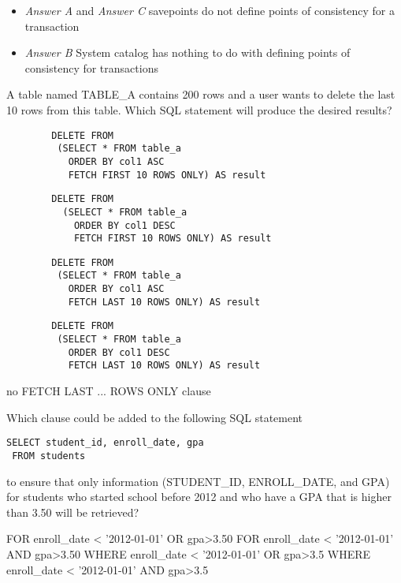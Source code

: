 \documentclass[answers, 11pt]{exam}
\begin{document}
\begin{questions}
\begin{solution}
\begin{itemize}
\item \textit{Answer A} and \textit{Answer C} savepoints do not define points of consistency for a transaction
\item \textit{Answer B} System catalog has nothing to do with defining points of consistency for
transactions
\end{itemize}
\end{solution}

\newpage
\question[1]
A table named TABLE\_A contains 200 rows and a user wants to delete
the last 10 rows from this table. Which SQL statement will produce the
desired results?
\begin{choices}
\choice \begin{verbatim}
		DELETE FROM
		 (SELECT * FROM table_a 
		   ORDER BY col1 ASC
		   FETCH FIRST 10 ROWS ONLY) AS result
		\end{verbatim}
\CorrectChoice \begin{verbatim}
		DELETE FROM
		  (SELECT * FROM table_a
			ORDER BY col1 DESC
			FETCH FIRST 10 ROWS ONLY) AS result
		\end{verbatim}
\choice \begin{verbatim}
		DELETE FROM
		 (SELECT * FROM table_a
		   ORDER BY col1 ASC
		   FETCH LAST 10 ROWS ONLY) AS result
		\end{verbatim}
\choice \begin{verbatim}
		DELETE FROM
		 (SELECT * FROM table_a
		   ORDER BY col1 DESC
		   FETCH LAST 10 ROWS ONLY) AS result
		\end{verbatim}
\end{choices}

\begin{solution}
no FETCH LAST ... ROWS ONLY clause
\end{solution}
\question[1]
Which clause could be added to the following SQL statement
\begin{verbatim}
SELECT student_id, enroll_date, gpa
 FROM students
\end{verbatim}
to ensure that only information (STUDENT\_ID, ENROLL\_DATE, and
GPA) for students who started school before 2012 and who have a GPA
that is higher than 3.50 will be retrieved?
\begin{choices}
\choice FOR enroll\_date < '2012-01-01' OR gpa>3.50
\choice FOR enroll\_date < '2012-01-01' AND gpa>3.50
\CorrectChoice WHERE enroll\_date < '2012-01-01' OR gpa>3.5
\choice	WHERE enroll\_date < '2012-01-01' AND gpa>3.5
\end{choices}


\end{questions}
\end{document}
